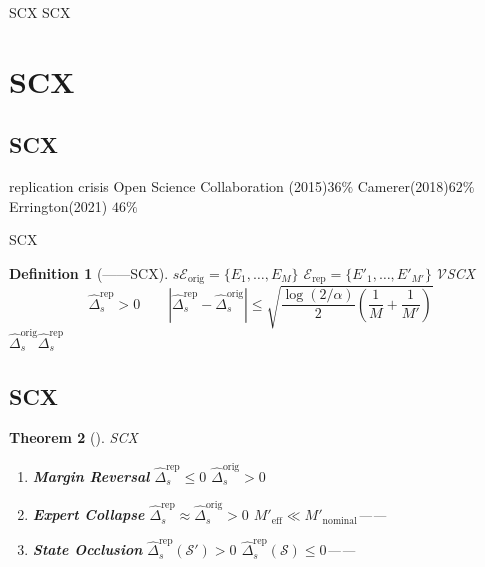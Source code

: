 \documentclass[11pt,a4paper]{article}
\newtheorem{theorem}{Theorem}[section]
\newtheorem{definition}[theorem]{Definition}
\theoremstyle{remark}
\begin{document}
SCX
SCX


\section{SCX}

\subsection{SCX}

replication crisis
Open Science Collaboration (2015)$36\%$
Camerer(2018)$62\%$Errington(2021)
$46\%$

SCX

\begin{definition}[——SCX]
\label{def:replication}
$s$$\mathcal{E}_{\text{orig}} = \{E_1, \ldots, E_M\}$
\textbf{}$\mathcal{E}_{\text{rep}} = \{E'_1, \ldots, E'_{M'}\}$
\textbf{}$\mathcal{V}$SCX
\begin{equation}
    \boxed{\hat{\Delta}_s^{\text{rep}} > 0 \quad \text{} \quad
    \left|\hat{\Delta}_s^{\text{rep}} - \hat{\Delta}_s^{\text{orig}}\right|
    \leq \sqrt{\frac{\log(2/\alpha)}{2}\left(\frac{1}{M} + \frac{1}{M'}\right)}}
\end{equation}
$\hat{\Delta}_s^{\text{orig}}$$\hat{\Delta}_s^{\text{rep}}$

\end{definition}

\subsection{SCX}

\begin{theorem}[]
\label{thm:replication_crisis}
SCX

\begin{enumerate}[label=\textbf{ \arabic*}, leftmargin=*]
    \item \textbf{Margin Reversal}
          $\hat{\Delta}_s^{\text{rep}} \leq 0$  $\hat{\Delta}_s^{\text{orig}} > 0$
          
    \item \textbf{Expert Collapse}
          $\hat{\Delta}_s^{\text{rep}} \approx \hat{\Delta}_s^{\text{orig}} > 0$
          $M'_{\text{eff}} \ll M'_{\text{nominal}}$——
    \item \textbf{State Occlusion}
          $\hat{\Delta}_s^{\text{rep}}(\mathcal{S}') > 0$
          $\hat{\Delta}_s^{\text{rep}}(\mathcal{S}) \leq 0$——
          
\end{enumerate}
\end{theorem}
\end{document}
